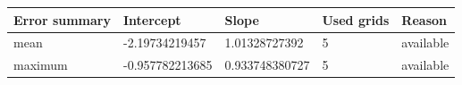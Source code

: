\begin{tabular}{lllll}
\hline
Error summary & Intercept & Slope & Used grids & Reason \\
\hline
mean & -2.19734219457 & 1.01328727392 & 5 & available \\
maximum & -0.957782213685 & 0.933748380727 & 5 & available \\
\hline
\end{tabular}
